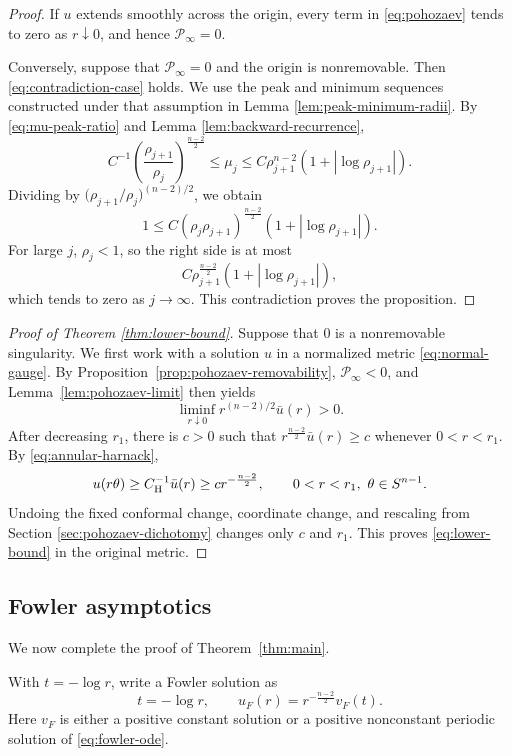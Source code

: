 \documentclass[11pt]{article}
\numberwithin{equation}{section}
\theoremstyle{remark}
\newcommand{\Sph}{S}
\newcommand{\cP}{\mathcal P}
\begin{document}
\par
\begin{proof}
If \(u\) extends smoothly across the origin, every term in
\eqref{eq:pohozaev} tends to zero as \(r\downarrow0\), and hence
\(\cP_\infty=0\).

Conversely, suppose that \(\cP_\infty=0\) and the origin is nonremovable.
Then \eqref{eq:contradiction-case} holds. We use the peak and minimum
sequences constructed under that assumption in
Lemma  \ref{lem:peak-minimum-radii}. By
\eqref{eq:mu-peak-ratio} and
Lemma  \ref{lem:backward-recurrence},
\[
 C^{-1}\left(\frac{\rho_{j+1}}{\rho_j}\right)^{\frac{n-2}{2}}
 \le\mu_j
 \le C\rho_{j+1}^{n-2}(1+|\log\rho_{j+1}|).
\]
Dividing by
\(\bigl(\rho_{j+1}/\rho_j\bigr)^{(n-2)/2}\), we obtain
\[
 1\le C(\rho_j\rho_{j+1})^{\frac{n-2}{2}}
 (1+|\log\rho_{j+1}|).
\]
For large \(j\), \(\rho_j<1\), so the right side is at most
\[
 C\rho_{j+1}^{\frac{n-2}{2}}(1+|\log\rho_{j+1}|),
\]
which tends to zero as \(j\to\infty\). This contradiction proves the
proposition.
\end{proof}

\par
\begin{proof}[Proof of Theorem  \ref{thm:lower-bound}]
 Suppose that \(0\) is a nonremovable singularity. 
 We first work with a solution $u$ in a normalized metric \eqref{eq:normal-gauge}. By Proposition~\ref{prop:pohozaev-removability}, \(\cP_\infty<0\), and Lemma~\ref{lem:pohozaev-limit} then yields
\[
\liminf_{r\downarrow0}r^{(n-2)/2}\bar u(r)>0.
\]
After decreasing \(r_1\), there is \(c>0\) such that
\(r^{\frac{n-2}{2}}\bar u(r)\ge c\) whenever \(0<r<r_1\).  By
\eqref{eq:annular-harnack},
\[
 u(r\theta)\ge C_{\rm H}^{-1}\bar u(r)
 \ge cr^{-\frac{n-2}{2}},
 \qquad 0<r<r_1,\ \theta\in\Sph^{n-1}.
\]
Undoing the fixed conformal change, coordinate change, and rescaling from
Section  \ref{sec:pohozaev-dichotomy} changes only \(c\) and \(r_1\). This proves
\eqref{eq:lower-bound} in the original metric.
\end{proof}

\par
\subsection{Fowler asymptotics}

We now complete the proof of Theorem~\ref{thm:main}.

With \(t=-\log r\), write a Fowler solution as
\begin{equation}\label{eq:fowler-transformation}
 t=-\log r,\qquad u_F(r)=r^{-\frac{n-2}{2}}v_F(t).
\end{equation}
Here \(v_F\) is either a positive constant solution or a positive
nonconstant periodic solution of \eqref{eq:fowler-ode}.
\end{document}
